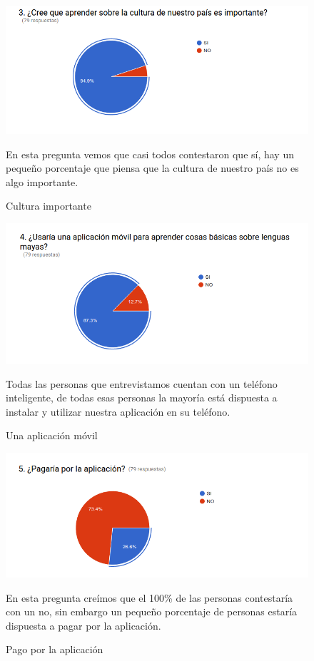 \documentclass[a4paper,openright,11pt]{article}
\begin{document}
\begin{figure}
	\includegraphics[width=1.0\textwidth]{e3}
	\caption{Cultura importante}
	\label{fig:e3}
	En esta pregunta vemos que casi todos contestaron que sí, hay un pequeño porcentaje que piensa que la cultura de nuestro país no es algo importante.
\end{figure}
\begin{figure}
	\includegraphics[width=1.0\textwidth]{e4}
	\caption{Una aplicación móvil}
	\label{fig:e4}
	Todas las personas que entrevistamos cuentan con un teléfono inteligente, de todas esas personas la mayoría está dispuesta a instalar y utilizar nuestra aplicación en su teléfono.
\end{figure}
\begin{figure}
	\includegraphics[width=1.0\textwidth]{e5}
	\caption{Pago por la aplicación}
	\label{fig:e5}
	En esta pregunta creímos que el 100\% de las personas contestaría con un no, sin embargo un pequeño porcentaje de personas estaría dispuesta a pagar por la aplicación.
\end{figure}
\end{document}
